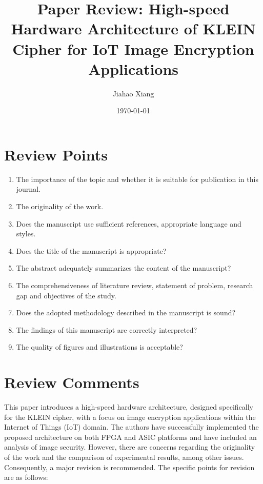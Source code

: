 \documentclass{article}
\title{Paper Review: High-speed Hardware Architecture of KLEIN Cipher for IoT Image Encryption Applications}
\author{Jiahao Xiang}
\date{\today}
\begin{document}
\maketitle

\section{Review Points}
\begin{enumerate}
    \item The importance of the topic and whether it is suitable for publication in this journal.
    \item The originality of the work.
    \item Does the manuscript use sufficient references, appropriate language and styles.
    \item Does the title of the manuscript is appropriate?
    \item The abstract adequately summarizes the content of the manuscript?
    \item The comprehensiveness of literature review, statement of problem, research gap and objectives of the study.
    \item Does the adopted methodology described in the manuscript is sound?
    \item The findings of this manuscript are correctly interpreted?
    \item The quality of figures and illustrations is acceptable?
\end{enumerate}

\section{Review Comments}

This paper introduces a high-speed hardware architecture, designed specifically for the KLEIN cipher, with a focus on image encryption applications within the Internet of Things (IoT) domain. The authors have successfully implemented the proposed architecture on both FPGA and ASIC platforms and have included an analysis of image security. However, there are concerns regarding the originality of the work and the comparison of experimental results, among other issues. Consequently, a major revision is recommended. The specific points for revision are as follows:
\end{document}
